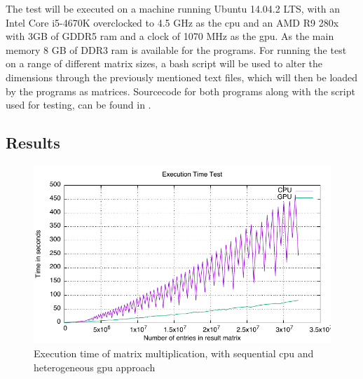 The test will be executed on a machine running Ubuntu 14.04.2 LTS, with an Intel Core i5-4670K overclocked to 4.5 GHz as the \gls{cpu} and an AMD R9 280x with 3GB of GDDR5 ram and a clock of 1070 MHz as the \gls{gpu}.
As the main memory 8 GB of DDR3 ram is available for the programs.
For running the test on a range of different matrix sizes, a bash script will be used to alter the dimensions through the previously mentioned text files, which will then be loaded by the programs as matrices.
Sourcecode for both programs along with the script used for testing, can be found in .

\subsection{Results} %
\label{sub:results}

\begin{figure}[h!]
    \centering
    \includegraphics{figures/tests/graph.pdf}
    \caption{Execution time of matrix multiplication, with sequential \gls{cpu} and heterogeneous \gls{gpu} approach}\label{fig:test_results}
\end{figure}

